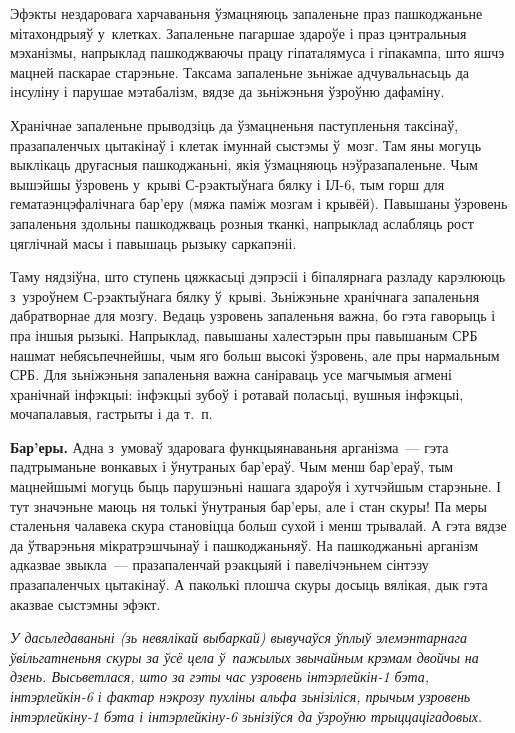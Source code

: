 
Эфэкты нездаровага харчаваньня ўзмацняюць запаленьне праз пашкоджаньне мітахондрыяў у~клетках. Запаленьне пагаршае здароўе і праз цэнтральныя мэханізмы, напрыклад пашкоджваючы працу гіпаталямуса і гіпакампа, што яшчэ мацней паскарае старэньне. Таксама запаленьне зьніжае адчувальнасьць да інсуліну і парушае мэтабалізм, вядзе да зьніжэньня ўзроўню дафаміну.

Хранічнае запаленьне прыводзіць да ўзмацненьня паступленьня таксінаў, празапаленчых цытакінаў і клетак імуннай сыстэмы ў~мозг. Там яны могуць выклікаць другасныя пашкоджаньні, якія ўзмацняюць нэўразапаленьне. Чым вышэйшы ўзровень у~крыві С-рэактыўнага бялку і ІЛ-6, тым горш для гематаэнцэфалічнага бар'еру (мяжа паміж мозгам і крывёй). Павышаны ўзровень запаленьня здольны пашкоджваць розныя тканкі, напрыклад аслабляць рост цяглічнай масы і павышаць рызыку саркапэніі.

Таму нядзіўна, што ступень цяжкасьці дэпрэсіі і біпалярнага разладу карэлююць з~узроўнем С-рэактыўнага бялку ў~крыві. Зьніжэньне хранічнага запаленьня дабратворнае для мозгу. Ведаць узровень запаленьня важна, бо гэта гаворыць і пра іншыя рызыкі. Напрыклад, павышаны халестэрын пры павышаным СРБ нашмат небясьпечнейшы, чым яго больш высокі ўзровень, але пры нармальным СРБ. Для зьніжэньня запаленьня важна саніраваць усе магчымыя агмені хранічнай інфэкцыі: інфэкцыі зубоў і ротавай поласьці, вушныя інфэкцыі, мочапалавыя, гастрыты і да т.~п.

\textbf{Бар'еры.} Адна з~умоваў здаровага функцыянаваньня арганізма~--- гэта падтрыманьне вонкавых і ўнутраных бар'ераў. Чым менш бар'ераў, тым мацнейшымі могуць быць парушэньні нашага здароўя і хутчэйшым старэньне. І тут значэньне маюць ня толькі ўнутраныя бар'еры, але і стан скуры! Па меры сталеньня чалавека скура становіцца больш сухой і менш трывалай. А гэта вядзе да ўтварэньня мікратрэшчынаў і пашкоджаньняў. На пашкоджаньні арганізм адказвае звыкла~--- празапаленчай рэакцыяй і павелічэньнем сінтэзу празапаленчых цытакінаў. А паколькі плошча скуры досыць вялікая, дык гэта аказвае сыстэмны эфэкт.

\emph{У дасьледаваньні (зь невялікай выбаркай) вывучаўся ўплыў элемэнтарнага ўвільгатненьня скуры за ўсё цела ў~пажылых звычайным крэмам двойчы на дзень. Высьветлася, што за гэты час узровень інтэрлейкін-1 бэта, інтэрлейкін-6 і фактар нэкрозу пухліны альфа зьнізіліся, прычым узровень інтэрлейкіну-1 бэта і інтэрлейкіну-6 зьнізіўся да ўзроўню трыццацігадовых.}

